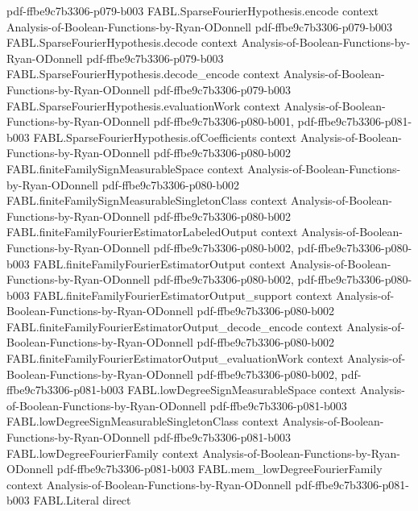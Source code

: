 \begin{theorem}
  {pdf-ffbe9c7b3306-p079-b003}
\proofstep
  {FABL.SparseFourierHypothesis.encode}
  {context}
  {Analysis-of-Boolean-Functions-by-Ryan-ODonnell}
  {pdf-ffbe9c7b3306-p079-b003}
\proofstep
  {FABL.SparseFourierHypothesis.decode}
  {context}
  {Analysis-of-Boolean-Functions-by-Ryan-ODonnell}
  {pdf-ffbe9c7b3306-p079-b003}
\proofstep
  {FABL.SparseFourierHypothesis.decode_encode}
  {context}
  {Analysis-of-Boolean-Functions-by-Ryan-ODonnell}
  {pdf-ffbe9c7b3306-p079-b003}
\proofstep
  {FABL.SparseFourierHypothesis.evaluationWork}
  {context}
  {Analysis-of-Boolean-Functions-by-Ryan-ODonnell}
  {pdf-ffbe9c7b3306-p080-b001,
    pdf-ffbe9c7b3306-p081-b003}
\proofstep
  {FABL.SparseFourierHypothesis.ofCoefficients}
  {context}
  {Analysis-of-Boolean-Functions-by-Ryan-ODonnell}
  {pdf-ffbe9c7b3306-p080-b002}
\proofstep
  {FABL.finiteFamilySignMeasurableSpace}
  {context}
  {Analysis-of-Boolean-Functions-by-Ryan-ODonnell}
  {pdf-ffbe9c7b3306-p080-b002}
\proofstep
  {FABL.finiteFamilySignMeasurableSingletonClass}
  {context}
  {Analysis-of-Boolean-Functions-by-Ryan-ODonnell}
  {pdf-ffbe9c7b3306-p080-b002}
\proofstep
  {FABL.finiteFamilyFourierEstimatorLabeledOutput}
  {context}
  {Analysis-of-Boolean-Functions-by-Ryan-ODonnell}
  {pdf-ffbe9c7b3306-p080-b002,
    pdf-ffbe9c7b3306-p080-b003}
\proofstep
  {FABL.finiteFamilyFourierEstimatorOutput}
  {context}
  {Analysis-of-Boolean-Functions-by-Ryan-ODonnell}
  {pdf-ffbe9c7b3306-p080-b002,
    pdf-ffbe9c7b3306-p080-b003}
\proofstep
  {FABL.finiteFamilyFourierEstimatorOutput_support}
  {context}
  {Analysis-of-Boolean-Functions-by-Ryan-ODonnell}
  {pdf-ffbe9c7b3306-p080-b002}
\proofstep
  {FABL.finiteFamilyFourierEstimatorOutput_decode_encode}
  {context}
  {Analysis-of-Boolean-Functions-by-Ryan-ODonnell}
  {pdf-ffbe9c7b3306-p080-b002}
\proofstep
  {FABL.finiteFamilyFourierEstimatorOutput_evaluationWork}
  {context}
  {Analysis-of-Boolean-Functions-by-Ryan-ODonnell}
  {pdf-ffbe9c7b3306-p080-b002,
    pdf-ffbe9c7b3306-p081-b003}
\proofstep
  {FABL.lowDegreeSignMeasurableSpace}
  {context}
  {Analysis-of-Boolean-Functions-by-Ryan-ODonnell}
  {pdf-ffbe9c7b3306-p081-b003}
\proofstep
  {FABL.lowDegreeSignMeasurableSingletonClass}
  {context}
  {Analysis-of-Boolean-Functions-by-Ryan-ODonnell}
  {pdf-ffbe9c7b3306-p081-b003}
\proofstep
  {FABL.lowDegreeFourierFamily}
  {context}
  {Analysis-of-Boolean-Functions-by-Ryan-ODonnell}
  {pdf-ffbe9c7b3306-p081-b003}
\proofstep
  {FABL.mem_lowDegreeFourierFamily}
  {context}
  {Analysis-of-Boolean-Functions-by-Ryan-ODonnell}
  {pdf-ffbe9c7b3306-p081-b003}
\proofstep
  {FABL.Literal}
  {direct}

\end{theorem}
